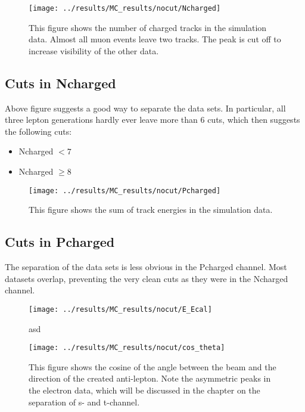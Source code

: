 \newpage
\begin{figure}[h]
\centering
\texttt{[image: ../results/MC\_results/nocut/Ncharged]}
\caption[Ncharged in simulation data]{This figure shows the number of charged tracks in the simulation data. Almost all muon events leave two tracks. The peak is cut off to increase visibility of the other data.}
\label{fig:Ncharged}
\end{figure}

\subsection{Cuts in Ncharged}
Above figure suggests a good way to separate the data sets. In particular, all three lepton generations hardly ever leave more than 6 cuts, which then suggests the following cuts:

\begin{itemize}
	\item{ Ncharged $<7$}
	\item{ Ncharged $\ge8$}
\end{itemize}



\newpage
\begin{figure}[h]
\centering
\texttt{[image: ../results/MC\_results/nocut/Pcharged]}
\caption[Pcharged in simulation data]{This figure shows the sum of track energies in the simulation data. }
\label{fig:Pcharged}
\end{figure}

\subsection{Cuts in Pcharged}
The separation of the data sets is less obvious in the Pcharged channel. Most datasets overlap, preventing the very clean cuts as they were in the Ncharged channel.


\begin{figure}[h]
\centering
\texttt{[image: ../results/MC\_results/nocut/E\_Ecal]}
\caption[E\_Ecal in simulations]{asd}
\label{fig:E_Ecal}
\end{figure}


\begin{figure}[h]
\centering
\texttt{[image: ../results/MC\_results/nocut/cos\_theta]}
\caption[Cos\_theta in simulation data]{This figure shows the cosine of the angle between the beam and the direction of the created anti-lepton. Note the asymmetric peaks in the electron data, which will be discussed in the chapter on the separation of s- and t-channel.}
\label{fig:cos_theta}
\end{figure}

